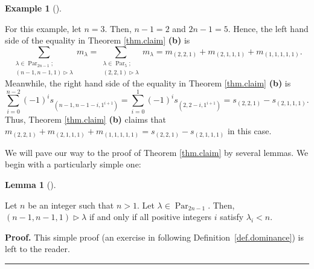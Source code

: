 \documentclass[numbers=enddot,12pt,final,onecolumn,notitlepage]{scrartcl}%
\theoremstyle{definition}
\newtheorem{lem}[theo]{Lemma}
\newenvironment{lemma}[1][]
{\begin{lem}[#1]\begin{leftbar}}
{\end{leftbar}\end{lem}}
\newtheorem{exam}[theo]{Example}
\newenvironment{example}[1][]
{\begin{exam}[#1]\begin{leftbar}}
{\end{leftbar}\end{exam}}
\newenvironment{proof}[1][Proof]{\noindent\textbf{#1.} }{\ \rule{0.5em}{0.5em}}
\let\sumnonlimits\sum
\renewcommand{\sum}{\sumnonlimits\limits}
\newenvironment{vershort}{}{}
\begin{document}
\begin{example}
For this example, let $n=3$. Then, $n-1=2$ and $2n-1=5$. Hence, the left hand
side of the equality in Theorem \ref{thm.claim} \textbf{(b)} is%
\[
\sum_{\substack{\lambda\in\operatorname*{Par}\nolimits_{2n-1};\\\left(
n-1,n-1,1\right)  \triangleright\lambda}}m_{\lambda}=\sum_{\substack{\lambda
\in\operatorname*{Par}\nolimits_{5};\\\left(  2,2,1\right)  \triangleright
\lambda}}m_{\lambda}=m_{\left(  2,2,1\right)  }+m_{\left(  2,1,1,1\right)
}+m_{\left(  1,1,1,1,1\right)  }.
\]
Meanwhile, the right hand side of the equality in Theorem \ref{thm.claim}
\textbf{(b)} is%
\[
\sum_{i=0}^{n-2}\left(  -1\right)  ^{i}s_{\left(  n-1,n-1-i,1^{i+1}\right)
}=\sum_{i=0}^{1}\left(  -1\right)  ^{i}s_{\left(  2,2-i,1^{i+1}\right)
}=s_{\left(  2,2,1\right)  }-s_{\left(  2,1,1,1\right)  }.
\]
Thus, Theorem \ref{thm.claim} \textbf{(b)} claims that $m_{\left(
2,2,1\right)  }+m_{\left(  2,1,1,1\right)  }+m_{\left(  1,1,1,1,1\right)
}=s_{\left(  2,2,1\right)  }-s_{\left(  2,1,1,1\right)  }$ in this case.
\end{example}

We will pave our way to the proof of Theorem \ref{thm.claim} by several
lemmas. We begin with a particularly simple one:

\begin{lemma}
\label{lem.dominnn-1}Let $n$ be an integer such that $n>1$. Let $\lambda
\in\operatorname*{Par}\nolimits_{2n-1}$. Then, $\left(  n-1,n-1,1\right)
\triangleright\lambda$ if and only if all positive integers $i$ satisfy
$\lambda_{i}<n$.
\end{lemma}

\begin{vershort}
\begin{proof}
This simple proof (an exercise in following Definition~\ref{def.dominance}) is
left to the reader.
\end{proof}
\end{vershort}
\end{document}
